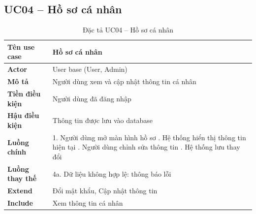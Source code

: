\subsection*{UC04 -- Hồ sơ cá nhân}
\begin{table}[H]
    \captionsetup{justification=raggedright, singlelinecheck=false}
    \caption{Đặc tả UC04 -- Hồ sơ cá nhân}
\centering
\begin{tabular}{|p{3.5cm}|p{10cm}|}
\hline
\textbf{Tên use case} & Hồ sơ cá nhân \\
\hline
\textbf{Actor} & User base (User, Admin) \\
\hline
\textbf{Mô tả} & Người dùng xem và cập nhật thông tin cá nhân \\
\hline
\textbf{Tiền điều kiện} & Người dùng đã đăng nhập \\
\hline
\textbf{Hậu điều kiện} & Thông tin được lưu vào database \\
\hline
\textbf{Luồng chính} &
  1. Người dùng mở màn hình hồ sơ \newline
  2. Hệ thống hiển thị thông tin hiện tại \newline
  3. Người dùng chỉnh sửa thông tin \newline
  4. Hệ thống lưu thay đổi \\
\hline
\textbf{Luồng thay thế} &
  4a. Dữ liệu không hợp lệ: thông báo lỗi \\
\hline
\textbf{Extend} & Đổi mật khẩu, Cập nhật thông tin \\
\hline
\textbf{Include} & Xem thông tin cá nhân \\
\hline
\end{tabular}

\end{table}

